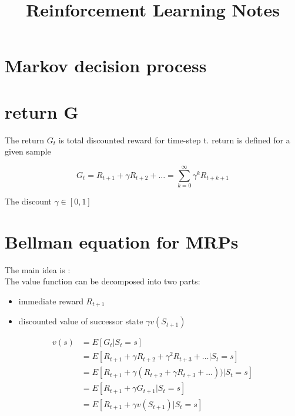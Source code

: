\documentclass[10pt,a4paper]{article}
\title{Reinforcement Learning Notes}
\begin{document}
\maketitle
	
\section{Markov decision process}

\section{return G}

The return $G_t$ is total discounted reward for time-step t. return is defined for a given sample

\begin{equation}
	G_t = R_{t+1} + \gamma R_{t+2} + \dots = \sum_{k=0}^{\infty} \gamma ^k R_{t+k+1}
\end{equation}

The discount $\gamma \in [0,1]$

\section{Bellman equation for MRPs}

The main idea is :\\

The value function can be decomposed into two parts:
\begin{itemize}
	\item immediate reward $R_{t+1}$
	\item discounted value of successor state $\gamma v(S_{t+1})$
\end{itemize}
	
\begin{equation}
\begin{split}
	v(s) & = E[G_t | S_t = s] \\
& = E[R_{t+1} + \gamma R_{t+2} + \gamma^2 R_{t+3} + \dots | S_t = s] \\
& = E[R_{t+1} + \gamma (R_{t+2} + \gamma R_{t+3} + \dots)) | S_t = s] \\
& = E[R_{t+1} + \gamma G_{t+1} | S_t = s] \\
& = E[R_{t+1} + \gamma v(S_{t+1})| S_t = s] \\
\end{split}
\end{equation}
	
\end{document}
